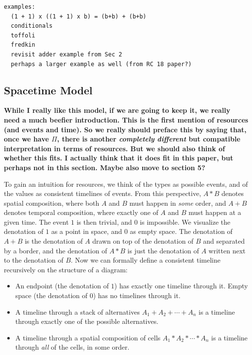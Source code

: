 \documentclass{article}
\newcommand{\jc}[1]{\fbox{Jacques says:} \textbf{#1}}
\begin{document}
\begin{verbatim}
examples:
  (1 + 1) x ((1 + 1) x b) = (b+b) + (b+b)
  conditionals
  toffoli
  fredkin
  revisit adder example from Sec 2 
  perhaps a larger example as well (from RC 18 paper?)
\end{verbatim}

\subsection{Spacetime Model}
\jc{While I really like this model, if we are going to keep it, we
really need a much beefier introduction. This is the first mention of
resources (and events and time). So we really should preface this by
saying that, once we have $\Pi$, there is another \emph{completely
different} but compatible interpretation in terms of resources. But
we should also think of whether this fits. I actually think that it 
does fit in this paper, but perhaps not in this section. Maybe
also move to section 5?}

To gain an intuition for resources, we think of the types as possible
events, and of the values as consistent timelines of events. From this
perspective, $A * B$ denotes spatial composition, where both $A$ and
$B$ must happen in \emph{some} order, and $A + B$ denotes temporal
composition, where exactly one of $A$ and $B$ must happen at a given
time. The event $1$ is then trivial, and $0$ is impossible.  We
visualize the denotation of $1$ as a point in space, and $0$ as empty
space. The denotation of $A + B$ is the denotation of $A$ drawn on top
of the denotation of $B$ and separated by a border, and the denotation
of $A * B$ is just the denotation of $A$ written next to the
denotation of $B$. Now we can formally define a consistent timeline
recursively on the structure of a diagram:

\begin{itemize}
\item An endpoint (the denotation of $1$) has exactly one timeline
  through it.  Empty space (the denotation of $0$) has no timelines
  through it.
\item A timeline through a stack of alternatives
  $A_1 + A_2 + \cdots + A_n$ is a timeline through exactly one of the
  possible alternatives.
\item A timeline through a spatial composition of cells
  $A_1 * A_2 * \cdots * A_n$ is a timeline through \emph{all} of the
  cells, in some order.
\end{itemize}
\end{document}
